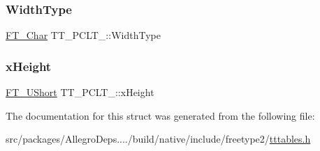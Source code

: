 \mbox{\label{struct_t_t___p_c_l_t___ad6613ad7556599343f999a7d27a0f1d0}} 
\subsubsection{\texorpdfstring{Width\+Type}{WidthType}}
{\footnotesize\ttfamily \hyperlink{fttypes_8h_a0f851552b050883885f0a0855771f39d}{F\+T\+\_\+\+Char} T\+T\+\_\+\+P\+C\+L\+T\+\_\+\+::\+Width\+Type}

\mbox{\label{struct_t_t___p_c_l_t___a4b2f3e6bf6508eacbff5e4eb16745872}} 
\subsubsection{\texorpdfstring{x\+Height}{xHeight}}
{\footnotesize\ttfamily \hyperlink{fttypes_8h_a937f6c17cf5ffd09086d8610c37b9f58}{F\+T\+\_\+\+U\+Short} T\+T\+\_\+\+P\+C\+L\+T\+\_\+\+::x\+Height}



The documentation for this struct was generated from the following file\+:\begin{DoxyCompactItemize}
\item 
src/packages/\+Allegro\+Deps..../build/native/include/freetype2/\hyperlink{tttables_8h}{tttables.\+h}\end{DoxyCompactItemize}
